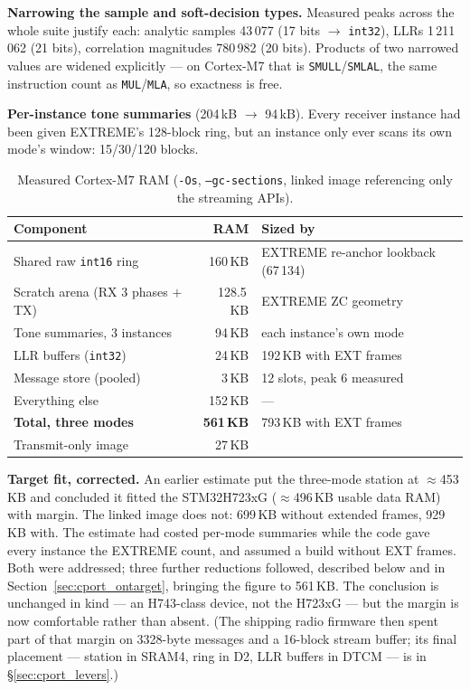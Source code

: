 \textbf{Narrowing the sample and soft-decision types.} Measured peaks
across the whole suite justify each: analytic samples 43\,077 (17 bits
$\rightarrow$ \texttt{int32}), LLRs 1\,211\,062 (21 bits), correlation
magnitudes 780\,982 (20 bits). Products of two narrowed values are
widened explicitly --- on Cortex-M7 that is \texttt{SMULL}/\texttt{SMLAL},
the same instruction count as \texttt{MUL}/\texttt{MLA}, so exactness is
free.

\textbf{Per-instance tone summaries} (204\,kB $\rightarrow$ 94\,kB).
Every receiver instance had been given EXTREME's 128-block ring, but an
instance only ever scans its own mode's window: 15/30/120 blocks.

\begin{table}[H]
    \centering
    \caption{Measured Cortex-M7 RAM (\texttt{-Os}, \texttt{--gc-sections},
             linked image referencing only the streaming APIs).}
    \label{tab:cport_ram}
    \small
    \begin{tabular}{@{}lrl@{}}
    \toprule
    \textbf{Component} & \textbf{RAM} & \textbf{Sized by} \\
    \midrule
    Shared raw \texttt{int16} ring & 160\,KB & EXTREME re-anchor
                                               lookback (67\,134) \\
    Scratch arena (RX 3 phases $+$ TX) & 128.5\,KB & EXTREME ZC
                                                     geometry \\
    Tone summaries, 3 instances & 94\,KB & each instance's own mode \\
    LLR buffers (\texttt{int32}) & 24\,KB & 192\,KB with EXT frames \\
    Message store (pooled) & 3\,KB & 12 slots, peak 6 measured \\
    Everything else & 152\,KB & --- \\
    \midrule
    \textbf{Total, three modes} & \textbf{561\,KB} & 793\,KB with EXT
                                                     frames \\
    Transmit-only image & 27\,KB & \\
    \bottomrule
    \end{tabular}
\end{table}

\textbf{Target fit, corrected.} An earlier estimate put the three-mode
station at $\approx$453\,KB and concluded it fitted the STM32H723xG
($\approx$496\,KB usable data RAM) with margin. The linked image does
not: 699\,KB without extended frames, 929\,KB with. The estimate had
costed per-mode summaries while the code gave every instance the
EXTREME count, and assumed a build without EXT frames. Both were
addressed; three further reductions followed, described below and in
Section~\ref{sec:cport_ontarget}, bringing the figure to 561\,KB. The
conclusion is unchanged in kind --- an H743-class device, not the
H723xG --- but the margin is now comfortable rather than absent.  (The
shipping radio firmware then spent part of that margin on 3328-byte
messages and a 16-block stream buffer; its final placement --- station
in SRAM4, ring in D2, LLR buffers in DTCM --- is in
\S\ref{sec:cport_levers}.)

